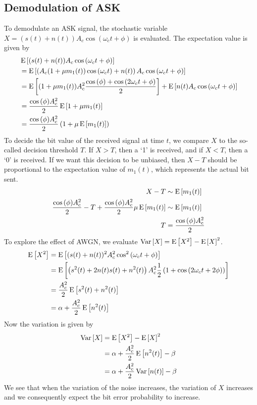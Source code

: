 \documentclass[11pt,titlepage]{report}
\begin{document}
\begin{appendices}
\subsection{Demodulation of ASK}
To demodulate an ASK signal, the stochastic variable $X=(s(t)+n(t)) A_c \cos{(\omega_c t + \phi)}$ is evaluated. The expectation value is given by
\begin{align*}
	&\operatorname{E}\left[(s(t)+n(t)) A_c \cos{(\omega_c t + \phi)}\right] \\
	&=\operatorname{E}\left[\left(A_c (1+\mu m_1(t)) \cos{(\omega_c t)} + n(t)\right) A_c \cos{(\omega_c t + \phi)}\right] \\
	&= \operatorname{E}\left[(1+\mu m_1(t)) A_c^2 \frac{\cos{(\phi)} + \cos{(2 \omega_c t + \phi)}}{2}\right] + \operatorname{E}\left[n(t) A_c \cos{(\omega_c t + \phi)}\right] \\
	&= \frac{\cos{(\phi)} A_c^2}{2} \operatorname{E}\left[1+\mu m_1(t)\right] \\
	&= \frac{\cos{(\phi)} A_c^2}{2} \left( 1 + \mu \operatorname{E}\left[m_1(t)\right] \right)
\end{align*}
To decide the bit value of the received signal at time $t$, we compare $X$ to the so-called decision threshold $T$. If $X>T$, then a `1' is received, and if $X<T$, then a `0' is received. If we want this decision to be unbiased, then $X-T$ should be proportional to the expectation value of $m_1(t)$, which represents the actual bit sent.
\begin{align*}
	X - T &\sim \operatorname{E}\left[m_1(t)\right] \\
    \frac{\cos{(\phi)} A_c^2}{2} - T+ \frac{\cos{(\phi)} A_c^2}{2}  \mu \operatorname{E}\left[m_1(t)\right] &\sim \operatorname{E}\left[m_1(t)\right] \\
    T &= \frac{\cos{(\phi)} A_c^2}{2}
\end{align*}
To explore the effect of AWGN, we evaluate $\operatorname{Var}\left[X\right]=\operatorname{E}\left[X^2\right]-\operatorname{E}\left[X\right]^2$. 
\begin{align*}
	\operatorname{E}\left[X^2\right]&=\operatorname{E}\left[(s(t)+n(t))^2 A_c^2 \cos^2{(\omega_c t + \phi)}\right] \\
	&=\operatorname{E}\left[\left(s^2(t)+2n(t)s(t)+n^2(t)\right) A_c^2 \frac{1}{2} \left( 1+ \cos{(2\omega_c t + 2\phi)}\right)\right] \\
	&=\frac{A_c^2}{2}\operatorname{E}\left[s^2(t) + n^2(t)\right] \\
	&=\alpha + \frac{A_c^2}{2} \operatorname{E}\left[n^2(t)\right]
\end{align*}
Now the variation is given by
\begin{align*}
	\operatorname{Var}\left[X\right] &= \operatorname{E}\left[X^2\right] - \operatorname{E}\left[X\right]^2 \\
	&= \alpha + \frac{A_c^2}{2} \operatorname{E}\left[n^2(t)\right] - \beta \\
	&= \alpha + \frac{A_c^2}{2} \operatorname{Var}\left[n(t)\right] - \beta
\end{align*}
We see that when the variation of the noise increases, the variation of $X$ increases and we consequently expect the bit error probability to increase.


\end{appendices}
\end{document}
